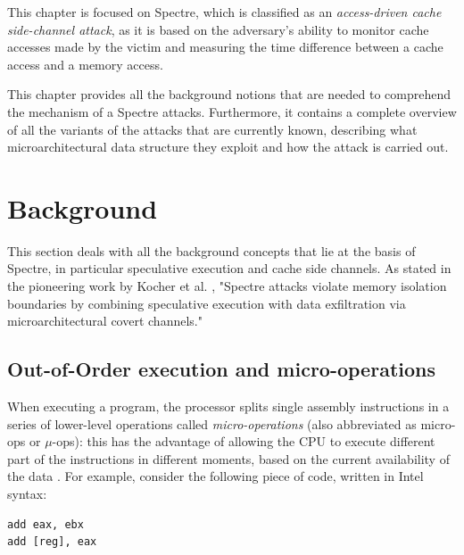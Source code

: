 \documentclass[12pt,a4paper]{book}
\theoremstyle{definition}
\begin{document}
	This chapter is focused on Spectre, which is classified as an \textit{access-driven cache side-channel attack}, as it is based on the adversary's ability to monitor cache accesses made by the victim and measuring the time difference between a cache access and a memory access.
	
	This chapter provides all the background notions that are needed to comprehend the mechanism of a Spectre attacks. Furthermore, it contains a complete overview of all the variants of the attacks that are currently known, describing what microarchitectural data structure they exploit and how the attack is carried out.
	\section{Background}
	This section deals with all the background concepts that lie at the basis of Spectre, in particular speculative execution and cache side channels. As stated in the pioneering work by Kocher et al. \cite{Kocher2019}, "Spectre attacks violate memory isolation boundaries by combining speculative execution with data exfiltration via microarchitectural covert channels."
	\subsection{Out-of-Order execution and micro-operations}\label{ooo-exec}
	When executing a program, the processor splits single assembly instructions in a series of lower-level operations called \textit{micro-operations} (also abbreviated as micro-ops or $\mu$-ops): this has the advantage of allowing the CPU to execute different part of the instructions in different moments, based on the current availability of the data \cite{Fog2021}. For example, consider the following piece of code, written in Intel syntax:
	
	\vspace{3mm}
	\begin{minipage}{.3\textwidth}
	\begin{lstlisting}
add eax, ebx
add [reg], eax
	\end{lstlisting}
	\end{minipage}
\end{document}
